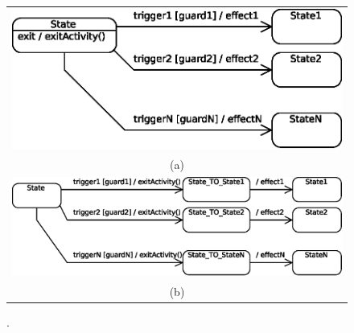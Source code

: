 \begin{figure}
\centering
  \begin{tabular}{c}
  \includegraphics[width=0.7\columnwidth]{images/exitActionsBEFORE}\\ 
(a)\\
  \includegraphics[width=0.85\columnwidth]{images/exitActionsAFTER}\\
(b)
  \end{tabular}
  \caption{.}
  \label{fig:}
\end{figure}
